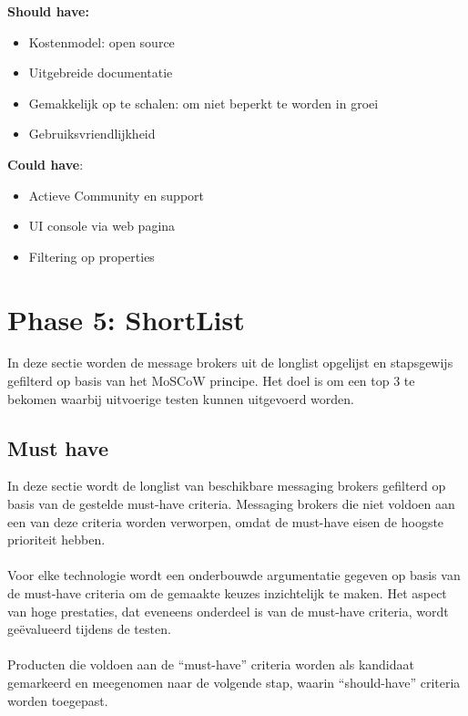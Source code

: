 \textbf{Should have:}
\begin{itemize}
  \item Kostenmodel: open source 
  \item Uitgebreide documentatie
  \item Gemakkelijk op te schalen: om niet beperkt te worden in groei
  \item Gebruiksvriendlijkheid
\end{itemize}

\textbf{Could have}:
\begin{itemize}
  \item Actieve Community en support
  \item UI console via web pagina 
  \item Filtering op properties
\end{itemize}

\newpage
\section{Phase 5: ShortList}
In deze sectie worden de message brokers uit de longlist opgelijst en stapsgewijs gefilterd op basis van het MoSCoW principe.
Het doel is om een top 3 te bekomen waarbij uitvoerige testen kunnen uitgevoerd worden.

\subsection{Must have}
In deze sectie wordt de longlist van beschikbare messaging brokers gefilterd op basis van de gestelde must-have criteria. 
Messaging brokers die niet voldoen aan een van deze criteria worden verworpen, omdat de must-have eisen de hoogste prioriteit hebben.
\\\\
Voor elke technologie wordt een onderbouwde argumentatie gegeven op basis van de must-have criteria om de gemaakte keuzes inzichtelijk te maken. 
Het aspect van hoge prestaties, dat eveneens onderdeel is van de must-have criteria, wordt geëvalueerd tijdens de testen.
\\\\
Producten die voldoen aan de ``must-have'' criteria worden als kandidaat gemarkeerd en meegenomen naar de volgende stap, waarin ``should-have'' criteria worden toegepast.
 
